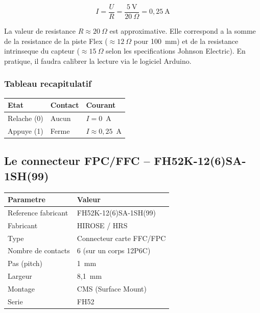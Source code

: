 \documentclass[12pt,a4paper]{article}
\begin{document}
\[
  I = \frac{U}{R} = \frac{5~\text{V}}{20~\Omega} = 0{,}25~\text{A}
\]

\begin{tcolorbox}[colback=yellow!10,colframe=orange!70,title=Remarque sur la resistance]
La valeur de resistance $R \approx 20~\Omega$ est approximative. Elle correspond a la
somme de la resistance de la piste Flex ($\approx 12~\Omega$ pour 100~mm) et de la
resistance intrinseque du capteur ($\approx 15~\Omega$ selon les specifications Johnson
Electric). En pratique, il faudra calibrer la lecture via le logiciel Arduino.
\end{tcolorbox}

\subsubsection{Tableau recapitulatif}

\begin{center}
\begin{tabular}{lll}
\toprule
\textbf{Etat} & \textbf{Contact} & \textbf{Courant} \\
\midrule
Relache (0) & Aucun & $I = 0$~A \\
Appuye (1)  & Ferme & $I \approx 0{,}25$~A \\
\bottomrule
\end{tabular}
\end{center}

\subsection{Le connecteur FPC/FFC -- FH52K-12(6)SA-1SH(99)}

\begin{center}
\begin{tabular}{ll}
\toprule
\textbf{Parametre} & \textbf{Valeur} \\
\midrule
Reference fabricant & FH52K-12(6)SA-1SH(99) \\
Fabricant           & HIROSE / HRS \\
Type                & Connecteur carte FFC/FPC \\
Nombre de contacts  & 6 (sur un corps 12P6C) \\
Pas (pitch)         & 1~mm \\
Largeur             & 8,1~mm \\
Montage             & CMS (Surface Mount) \\
Serie               & FH52 \\
\bottomrule
\end{tabular}
\end{center}
\end{document}
